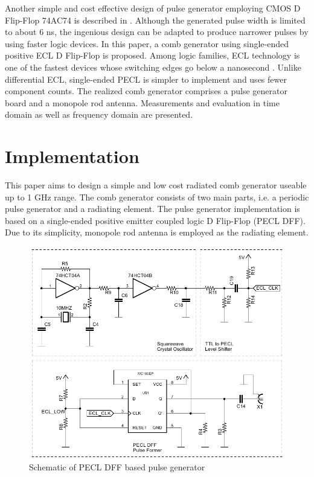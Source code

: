 \documentclass{pj}
\begin{document}
Another simple and cost effective design of pulse generator employing CMOS D Flip-Flop 74AC74 is described in \cite{Martin1988}. Although the generated pulse width is limited to about 6 ns, the ingenious design can be adapted to produce narrower pulses by using faster logic devices. In this paper, a comb generator using single-ended positive ECL D Flip-Flop is proposed. Among logic families, ECL technology is one of the fastest devices whose switching edges go below a nanosecond \cite{Montrose1999}. Unlike differential ECL, single-ended PECL is simpler to implement and uses fewer component counts. The realized comb generator comprises a pulse generator board and a monopole rod antenna. Measurements and evaluation in time domain as well as frequency domain are presented. 

\section{Implementation}
This paper aims to design a simple and low cost radiated comb generator useable up to 1 GHz range. The comb generator consists of two main parts, i.e. a periodic pulse generator and a radiating element. The pulse generator implementation is based on a single-ended positive emitter coupled logic D Flip-Flop (PECL DFF). Due to its simplicity, monopole rod antenna is employed as the radiating element.


\begin{figure}[h]
	\centerline{\includegraphics[width=0.75\columnwidth,draft=false]{comb_schematic.pdf}}
	\caption{Schematic of PECL DFF based pulse generator}
	\label{fig:pulse_generator}
\end{figure}
\end{document}
